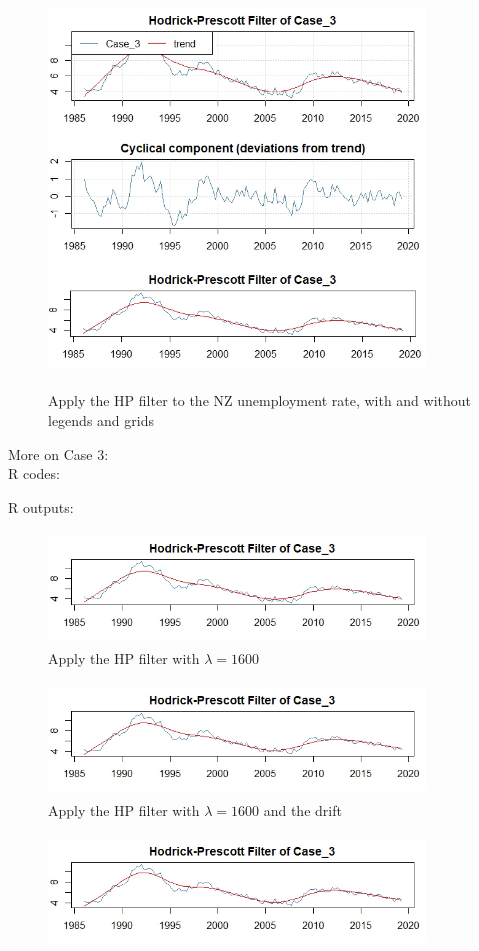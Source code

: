 \documentclass[10pt]{article}
\begin{document}
\begin{enumerate}[1)]
\begin{figure}[H]
  \includegraphics[width=10cm,height=10.5cm]{p17c.jpeg}
  \caption{Apply the HP filter to the NZ unemployment rate, with and without legends and grids}
\end{figure}
More on Case 3:\\
R codes:

R outputs:
\begin{figure}[H]
  \centering
  \includegraphics[width=10cm,height=3cm]{p17d.jpeg}
  \caption{Apply the HP filter with $\lambda=1600$}
\end{figure}
\begin{figure}[H]
  \centering
  \includegraphics[width=10cm,height=3cm]{p17e.jpeg}
  \caption{Apply the HP filter with $\lambda=1600$ and the drift}
\end{figure}
\begin{figure}[H]
  \centering
  \includegraphics[width=10cm,height=3cm]{p17f.jpeg}

\end{figure}
\end{enumerate}
\end{document}
